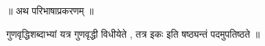 ॥ अथ परिभाषाप्रकरणम्‌ ॥

गुणवृद्धिशब्दाभ्यां यत्र गुणवृद्धी विधीयेते , तत्र इकः इति षष्ठ्यन्तं
पदमुपतिष्ठते ॥
